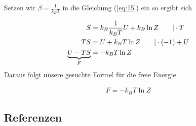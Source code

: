 Setzen wir \(\beta=\frac{1}{k_B T}\) in die Gleichung (\ref{eq:15}) ein so ergibt sich

\begin{align}
  \label{eq:16}
S &= k_B \frac{1}{k_B T} U + k_B \ln Z \qquad |\cdot T \notag \\
TS &=  U + k_B T \ln Z \qquad |\cdot (-1) +U \notag \\
\underbr{U - TS}_{F} &= - k_B T\ln Z 
\end{align}
Daraus folgt unsere gesuchte Formel für die freie Energie

\begin{align}
  \label{eq:17}
  \boxed{ F= - k_BT\ln Z }
\end{align}




\subsection*{Referenzen}



